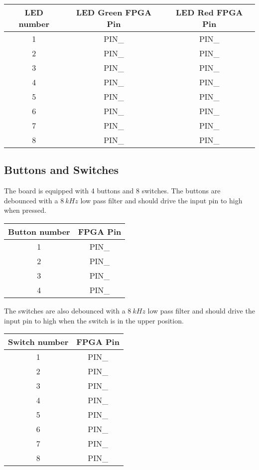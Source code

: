 \begin{center}
	\begin{tabular}{c c c}
		LED number & LED Green FPGA Pin & LED Red FPGA Pin \\
		\hline
		1 & PIN\_ & PIN\_ \\
		2 & PIN\_ & PIN\_ \\
		3 & PIN\_ & PIN\_ \\
		4 & PIN\_ & PIN\_ \\
		5 & PIN\_ & PIN\_ \\
		6 & PIN\_ & PIN\_ \\
		7 & PIN\_ & PIN\_ \\
		8 & PIN\_ & PIN\_ \\
		\hline
	\end{tabular}
\end{center}

\subsection{Buttons and Switches}
The board is equipped with 4 buttons and 8 switches.
The buttons are debounced with a $\SI{8}{kHz}$ low pass filter and should drive the input pin to high when pressed.

\begin{center}
	\begin{tabular}{c c}
		Button number & FPGA Pin \\
		\hline
		1 & PIN\_ \\
		2 & PIN\_ \\
		3 & PIN\_ \\
		4 & PIN\_ \\
		\hline
	\end{tabular}
\end{center}

The switches are also debounced with a $\SI{8}{kHz}$ low pass filter and should drive the input pin to high when the switch is in the upper position.

\begin{center}
	\begin{tabular}{c c}
		Switch number & FPGA Pin \\
		\hline
		1 & PIN\_ \\
		2 & PIN\_ \\
		3 & PIN\_ \\
		4 & PIN\_ \\
		5 & PIN\_ \\
		6 & PIN\_ \\
		7 & PIN\_ \\
		8 & PIN\_ \\
		\hline
	\end{tabular}
\end{center}

